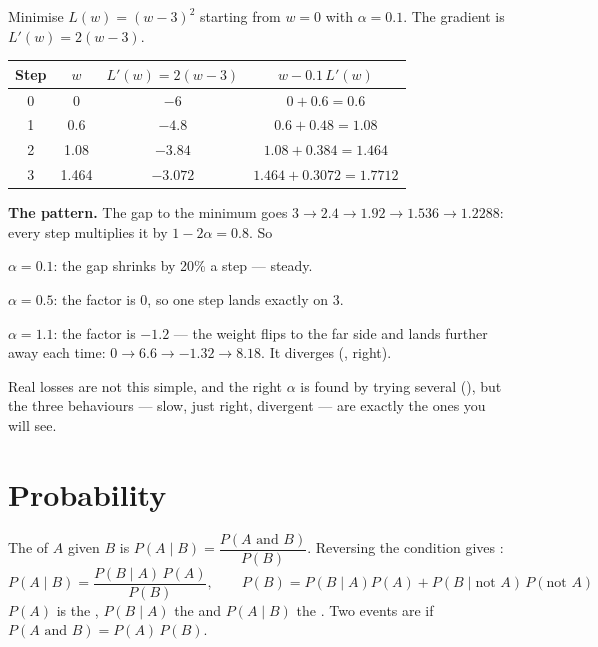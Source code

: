 \begin{worked}
Minimise $L(w) = (w-3)^2$ starting from $w = 0$ with $\alpha = 0.1$. The
gradient is $L'(w) = 2(w-3)$.

\smallskip
\begin{center}
\begin{tabular}{@{}cccc@{}}
\toprule
\textbf{Step} & $w$ & $L'(w) = 2(w-3)$ & $w - 0.1\,L'(w)$ \\
\midrule
0 & 0 & $-6$ & $0 + 0.6 = 0.6$ \\
1 & 0.6 & $-4.8$ & $0.6 + 0.48 = 1.08$ \\
2 & 1.08 & $-3.84$ & $1.08 + 0.384 = 1.464$ \\
3 & 1.464 & $-3.072$ & $1.464 + 0.3072 = 1.7712$ \\
\bottomrule
\end{tabular}
\end{center}

\smallskip
\textbf{The pattern.} The gap to the minimum goes $3 \to 2.4 \to 1.92 \to 1.536
\to 1.2288$: every step multiplies it by $1 - 2\alpha = 0.8$. So
\begin{tight}
  \item $\alpha = 0.1$: the gap shrinks by 20\% a step --- steady.
  \item $\alpha = 0.5$: the factor is 0, so one step lands exactly on 3.
  \item $\alpha = 1.1$: the factor is $-1.2$ --- the weight flips to the far side
        and lands further away each time: $0 \to 6.6 \to -1.32 \to 8.18$. It
        diverges (, right).
\end{tight}
Real losses are not this simple, and the right $\alpha$ is found by trying
several (), but the three behaviours --- slow, just right,
divergent --- are exactly the ones you will see.
\end{worked}

\section{Probability}

\begin{definitionbox}
The  of $A$ given $B$ is
$P(A \mid B) = \dfrac{P(A \text{ and } B)}{P(B)}$. Reversing the condition gives
:
\[
P(A \mid B) = \frac{P(B \mid A)\, P(A)}{P(B)},
\qquad P(B) = P(B\mid A)P(A) + P(B \mid \text{not }A)\,P(\text{not }A)
\]
$P(A)$ is the , $P(B\mid A)$ the  and $P(A \mid B)$ the
. Two events are  if $P(A \text{ and } B) =
P(A)\,P(B)$.
\end{definitionbox}

